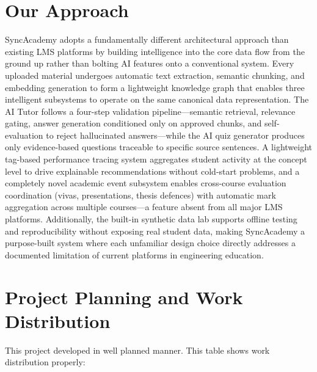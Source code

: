 \documentclass[12pt,a4paper]{report}
\begin{document}
\section{Our Approach}
SyncAcademy adopts a fundamentally different architectural approach than existing LMS platforms by building intelligence into the core data flow from the ground up rather than bolting AI features onto a conventional system. Every uploaded material undergoes automatic text extraction, semantic chunking, and embedding generation to form a lightweight knowledge graph that enables three intelligent subsystems to operate on the same canonical data representation. The AI Tutor follows a four-step validation pipeline—semantic retrieval, relevance gating, answer generation conditioned only on approved chunks, and self-evaluation to reject hallucinated answers—while the AI quiz generator produces only evidence-based questions traceable to specific source sentences. A lightweight tag-based performance tracing system aggregates student activity at the concept level to drive explainable recommendations without cold-start problems, and a completely novel academic event subsystem enables cross-course evaluation coordination (vivas, presentations, thesis defences) with automatic mark aggregation across multiple courses—a feature absent from all major LMS platforms. Additionally, the built-in synthetic data lab supports offline testing and reproducibility without exposing real student data, making SyncAcademy a purpose-built system where each unfamiliar design choice directly addresses a documented limitation of current platforms in engineering education.



\section{Project Planning and Work Distribution}
This project developed in well planned manner. This table shows work distribution properly:
\end{document}
